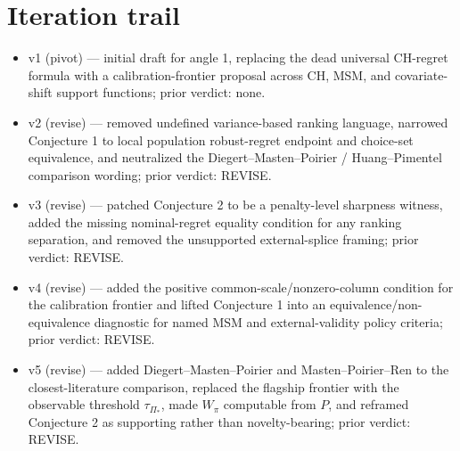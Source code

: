 \documentclass[11pt]{article}
\theoremstyle{definition}
\theoremstyle{plain}
\theoremstyle{remark}
\begin{document}
\section{Iteration trail}
\begin{itemize}[leftmargin=*]
\item v1 (pivot) --- initial draft for angle 1, replacing the dead universal CH-regret formula with a calibration-frontier proposal across CH, MSM, and covariate-shift support functions; prior verdict: none.
\item v2 (revise) --- removed undefined variance-based ranking language, narrowed Conjecture 1 to local population robust-regret endpoint and choice-set equivalence, and neutralized the Diegert--Masten--Poirier / Huang--Pimentel comparison wording; prior verdict: REVISE.
\item v3 (revise) --- patched Conjecture 2 to be a penalty-level sharpness witness, added the missing nominal-regret equality condition for any ranking separation, and removed the unsupported external-splice framing; prior verdict: REVISE.
\item v4 (revise) --- added the positive common-scale/nonzero-column condition for the calibration frontier and lifted Conjecture 1 into an equivalence/non-equivalence diagnostic for named MSM and external-validity policy criteria; prior verdict: REVISE.
\item v5 (revise) --- added Diegert--Masten--Poirier and Masten--Poirier--Ren to the closest-literature comparison, replaced the flagship frontier with the observable threshold $\tau_{\Pi_\ast}$, made $W_\pi$ computable from $P$, and reframed Conjecture 2 as supporting rather than novelty-bearing; prior verdict: REVISE.
\end{itemize}
\end{document}
